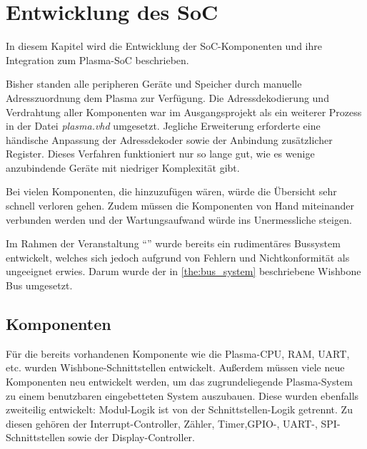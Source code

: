 \chapter{Entwicklung des \gls{SoC}}
\label{cha:plasma_extension}

In diesem Kapitel wird die Entwicklung der \gls{SoC}-Komponenten und ihre Integration zum Plasma-\gls{SoC} beschrieben.

Bisher standen alle peripheren Geräte und Speicher durch manuelle Adresszuordnung dem Plasma zur Verfügung. Die Adressdekodierung und Verdrahtung aller Komponenten war im Ausgangsprojekt als ein weiterer Prozess in der Datei \textit{plasma.vhd} umgesetzt. Jegliche Erweiterung erforderte eine händische Anpassung der Adressdekoder sowie der Anbindung zusätzlicher Register. Dieses Verfahren funktioniert nur so lange gut, wie es wenige anzubindende Geräte mit niedriger Komplexität gibt. 

Bei vielen Komponenten, die hinzuzufügen wären, würde die Übersicht sehr schnell verloren gehen. Zudem müssen die Komponenten von Hand miteinander verbunden werden und der Wartungsaufwand würde ins Unermessliche steigen. 

Im Rahmen der Veranstaltung \enquote{\subjectphv{}} wurde bereits ein rudimentäres Bussystem entwickelt, welches sich jedoch aufgrund von Fehlern und Nichtkonformität als ungeeignet erwies. Darum wurde der in \cref{the:bus_system} beschriebene Wishbone Bus umgesetzt.

\section{Komponenten}
\label{sec:plasma_soc_components}
Für die bereits vorhandenen Komponente wie die Plasma-CPU, \gls{RAM}, \gls{UART}, etc. wurden Wishbone-Schnittstellen entwickelt. Außerdem müssen viele neue Komponenten neu entwickelt werden, um das zugrundeliegende Plasma-System zu einem benutzbaren eingebetteten System auszubauen. Diese wurden ebenfalls zweiteilig entwickelt: Modul-Logik ist von der Schnittstellen-Logik getrennt. Zu diesen gehören der Interrupt-Controller, Zähler, Timer,\gls{GPIO}-, \gls{UART}-, \gls{SPI}-Schnittstellen sowie der Display-Controller.


